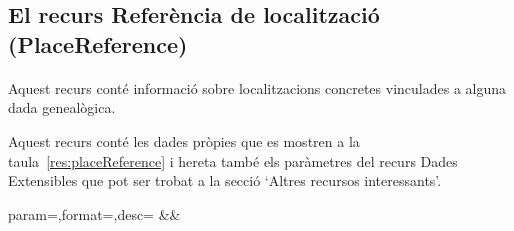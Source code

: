 \subsection{El recurs Referència de localització (PlaceReference)}

    \paragraph{}
    Aquest recurs conté informació sobre localitzacions concretes vinculades a alguna dada genealògica.

    Aquest recurs conté les dades pròpies que es mostren a la taula~\ref{res:placeReference} i hereta també els paràmetres del recurs  Dades Extensibles que pot ser trobat a la secció `Altres recursos interessants'.

    \begin{center}
             {param=\param,format=\format,desc=\desc}
             {\param&\format&\desc}
     \end{center}
